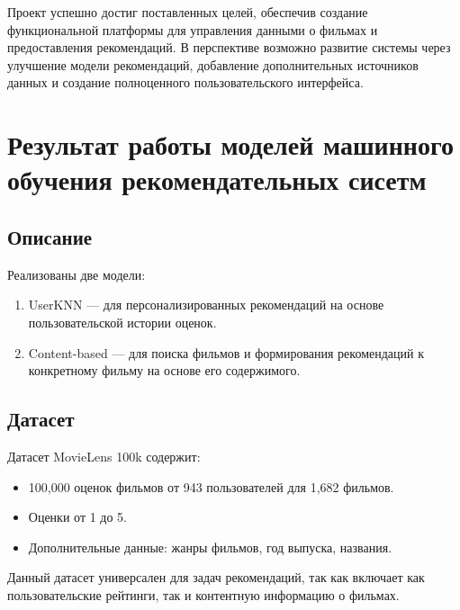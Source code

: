 Проект успешно достиг поставленных целей, обеспечив создание функциональной платформы для управления данными о фильмах и предоставления рекомендаций. В перспективе возможно развитие системы через улучшение модели рекомендаций, добавление дополнительных источников данных и создание полноценного пользовательского интерфейса.

\hypertarget{ux440ux435ux437ux443ux43bux44cux442ux430ux442-ux440ux430ux431ux43eux442ux44b-ux43cux43eux434ux435ux43bux435ux439-ux43cux430ux448ux438ux43dux43dux43eux433ux43e-ux43eux431ux443ux447ux435ux43dux438ux44f-ux440ux435ux43aux43eux43cux435ux43dux434ux430ux442ux435ux43bux44cux43dux44bux445-ux441ux438ux441ux435ux442ux43c}{%
\section{Результат работы моделей машинного обучения рекомендательных
сисетм}\label{ux440ux435ux437ux443ux43bux44cux442ux430ux442-ux440ux430ux431ux43eux442ux44b-ux43cux43eux434ux435ux43bux435ux439-ux43cux430ux448ux438ux43dux43dux43eux433ux43e-ux43eux431ux443ux447ux435ux43dux438ux44f-ux440ux435ux43aux43eux43cux435ux43dux434ux430ux442ux435ux43bux44cux43dux44bux445-ux441ux438ux441ux435ux442ux43c}}

\hypertarget{ux43eux43fux438ux441ux430ux43dux438ux435}{%
\subsection*{Описание}\label{ux43eux43fux438ux441ux430ux43dux438ux435}}

Реализованы две модели: 
\begin{enumerate}
\item
UserKNN --- для персонализированных
рекомендаций на основе пользовательской истории оценок. 

\item
Content-based --- для поиска фильмов и формирования
рекомендаций к конкретному фильму на основе его содержимого.
\end{enumerate}

\hypertarget{ux434ux430ux442ux430ux441ux435ux442}{%
\subsection*{Датасет}\label{ux434ux430ux442ux430ux441ux435ux442}}

Датасет MovieLens 100k содержит: 
\begin{itemize}
\item 
100,000 оценок фильмов от
943 пользователей для 1,682 фильмов. 
\item
Оценки от 1 до 5. 
\item
Дополнительные данные: жанры фильмов, год выпуска, названия.
\end{itemize}
Данный датасет универсален для задач рекомендаций, так как включает как
пользовательские рейтинги, так и контентную информацию о фильмах.

